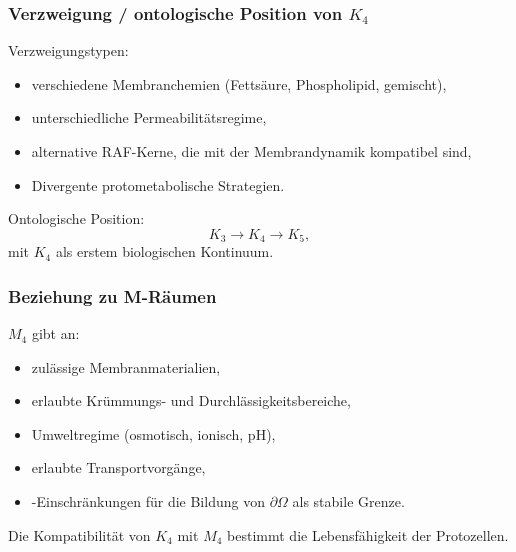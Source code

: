 \subsubsection{Verzweigung / ontologische Position von \texorpdfstring{$K_4$}{K_4}}

Verzweigungstypen:
\begin{itemize}
    \item verschiedene Membranchemien (Fettsäure, Phospholipid,
          gemischt),
    \item unterschiedliche Permeabilitätsregime,
    \item alternative RAF-Kerne, die mit der Membrandynamik kompatibel sind,
    \item Divergente protometabolische Strategien.
\end{itemize}

Ontologische Position:
\[
K_3 \to K_4 \to K_5,
\]
mit $K_4$ als erstem biologischen Kontinuum.

\subsubsection{Beziehung zu M-Räumen}

$M_4$ gibt an:
\begin{itemize}
    \item zulässige Membranmaterialien,
    \item erlaubte Krümmungs- und Durchlässigkeitsbereiche,
    \item Umweltregime (osmotisch, ionisch, pH),
    \item erlaubte Transportvorgänge,
    \item-Einschränkungen für die Bildung von $\partial\Omega$ als stabile Grenze.
\end{itemize}

Die Kompatibilität von $K_4$ mit $M_4$ bestimmt die Lebensfähigkeit der Protozellen.
